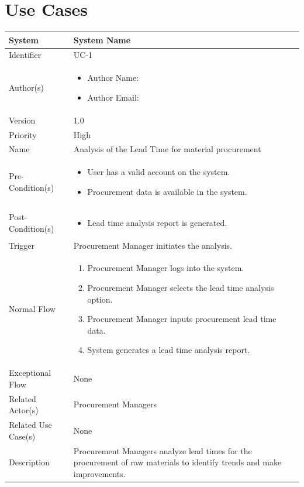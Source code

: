 \section{Use Cases}
\begin{center}
	\begin{tabularx}{\textwidth}{|l|X|}
		\hline
		System & System Name \\
		\hline
		Identifier & UC-1 \\
		\hline
		Author(s) & \begin{itemize}[left=0pt]
			\item Author Name:
			\item Author Email:
		\end{itemize} \\
		\hline
		Version & 1.0 \\
		\hline
		Priority & High \\
		\hline
		Name & Analysis of the Lead Time for material procurement \\
		\hline
		Pre-Condition(s) &  \begin{itemize}[left=0pt]
			\item User has a valid account on the system.
			\item Procurement data is available in the system.
		\end{itemize} \\
		\hline
		Post-Condition(s) & \begin{itemize}[left=0pt]
			\item Lead time analysis report is generated.
		\end{itemize} \\
		\hline
		Trigger & Procurement Manager initiates the analysis. \\
		\hline
		Normal Flow & \begin{enumerate}[left=0pt]
			\item Procurement Manager logs into the system.
			\item Procurement Manager selects the lead time analysis option.
			\item Procurement Manager inputs procurement lead time data.
			\item System generates a lead time analysis report.
		\end{enumerate} \\
		\hline
		Exceptional Flow & None \\
		\hline
		Related Actor(s) & Procurement Managers \\
		\hline
		Related Use Case(s) & None \\
		\hline
		Description & Procurement Managers analyze lead times for the procurement of raw materials to identify trends and make improvements. \\
		\hline
	\end{tabularx}
\end{center}


